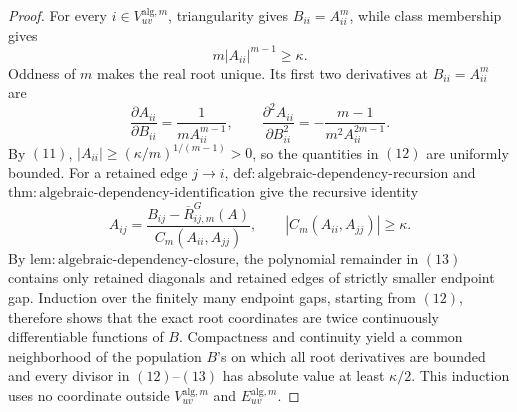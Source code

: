 \documentclass{article}
\begin{document}
\begin{proof}
For every \(i\in V_{uv}^{\mathrm{alg},m}\), triangularity gives \(B_{ii}=A_{ii}^m\), while class membership gives
\[
 m|A_{ii}|^{m-1}\ge\kappa.
\tag{11}
\]
Oddness of \(m\) makes the real root unique.  Its first two derivatives at \(B_{ii}=A_{ii}^m\) are
\[
 \frac{\partial A_{ii}}{\partial B_{ii}}
 =\frac{1}{mA_{ii}^{m-1}},
 \qquad
 \frac{\partial^2 A_{ii}}{\partial B_{ii}^2}
 =-\frac{m-1}{m^2A_{ii}^{2m-1}}.
\tag{12}
\]
By \((11)\), \(|A_{ii}|\ge(\kappa/m)^{1/(m-1)}>0\), so the quantities in \((12)\) are uniformly bounded.  For a retained edge \(j\to i\), \(\mathrm{def{:}algebraic\mbox{-}dependency\mbox{-}recursion}\) and \(\mathrm{thm{:}algebraic\mbox{-}dependency\mbox{-}identification}\) give the recursive identity
\[
 A_{ij}
 =\frac{B_{ij}-\overline R^{G}_{ij,m}(A)}
 {C_m(A_{ii},A_{jj})},
 \qquad
 |C_m(A_{ii},A_{jj})|\ge\kappa.
\tag{13}
\]
By \(\mathrm{lem{:}algebraic\mbox{-}dependency\mbox{-}closure}\), the polynomial remainder in \((13)\) contains only retained diagonals and retained edges of strictly smaller endpoint gap.  Induction over the finitely many endpoint gaps, starting from \((12)\), therefore shows that the exact root coordinates are twice continuously differentiable functions of \(B\).  Compactness and continuity yield a common neighborhood of the population \(B\)'s on which all root derivatives are bounded and every divisor in \((12)\)--\((13)\) has absolute value at least \(\kappa/2\).  This induction uses no coordinate outside \(V_{uv}^{\mathrm{alg},m}\) and \(E_{uv}^{\mathrm{alg},m}\).


\end{proof}
\end{document}
